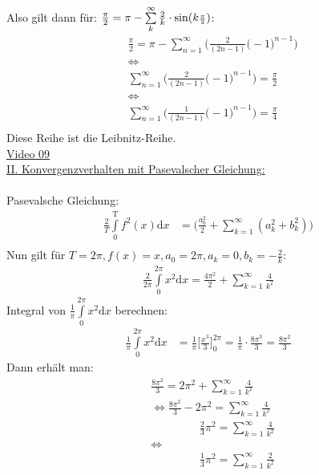 \newpage
Also gilt dann für: $ \frac{\pi}{2}=\pi-\sum\limits_{k}^{\infty}\frac{2}{k}\cdot \sin(k\genfrac{}{}{}{2}{\pi }{2 }) $:\\
\begin{align*}
&\frac{\pi}{2}=\pi-\sum\limits_{n=1}^{\infty}\bigg(\frac{2}{(2n-1)}\big(-1\big)^{n-1}\bigg)\\
&\Leftrightarrow\\
&\sum\limits_{n=1}^{\infty}\bigg(\frac{2}{(2n-1)}\big(-1\big)^{n-1}\bigg)=\frac{\pi}{2}\\
&\Leftrightarrow\\
&\sum\limits_{n=1}^{\infty}\bigg(\frac{1}{(2n-1)}\big(-1\big)^{n-1}\bigg)=\frac{\pi}{4}\\
\end{align*}
Diese Reihe ist die Leibnitz-Reihe.\\
\href{https://youtu.be/81emk4QNvwc}{Video 09}\\
\underline{II. Konvergenzverhalten mit Pasevalscher Gleichung:}\\
\\
Pasevalsche Gleichung:\\
\begin{align*}
\frac{2}{T}\int\limits_{0}^{\mathrm{T}} f^2(x)\mathrm{d}x&=\bigg(\frac{a_0^2}{2}+\sum\limits_{k=1}^{\infty}(a^2_k+b^2_k)\bigg)\\
\end{align*}
Nun gilt für $ T=2\pi, f(x)=x, a_0=2\pi, a_k=0, b_k=-\frac{2}{k} $:\\
\begin{align*}
\frac{2}{2\pi}\int\limits_{0}^{2\pi} x^2\mathrm{d}x=\frac{4\pi^2}{2}+\sum\limits_{k=1}^{\infty}\frac{4}{k^2}
\end{align*}
Integral von $\frac{1}{\pi}\int\limits_{0}^{2\pi} x^2\mathrm{d}x  $ berechnen:\\
\begin{align*}
\frac{1}{\pi}\int\limits_{0}^{2\pi} x^2\mathrm{d}x&=\frac{1}{\pi}\bigg[\frac{x^3}{3}\bigg]^{2\pi}_0=\frac{1}{\pi}\cdot\frac{8\pi^3}{3}=\frac{8\pi^2}{3}
\end{align*}
Dann erhält man:\\
\begin{align*}
&\frac{8\pi^2}{3}=2\pi^2+\sum\limits_{k=1}^{\infty}\frac{4}{k^2}\\
&\Leftrightarrow \frac{8\pi^2}{3}-2\pi^2=\sum\limits_{k=1}^{\infty}\frac{4}{k^2}\\
&\,\;\;\;\;\;\;\;\;\;\;\;\;\;\;\;\frac{2}{3}\pi^2=\sum\limits_{k=1}^{\infty}\frac{4}{k^2}\\
&\Leftrightarrow\\
&\,\;\;\;\;\;\;\;\;\;\;\;\;\;\;\;\frac{1}{3}\pi^2=\sum\limits_{k=1}^{\infty}\frac{2}{k^2}
\end{align*}
